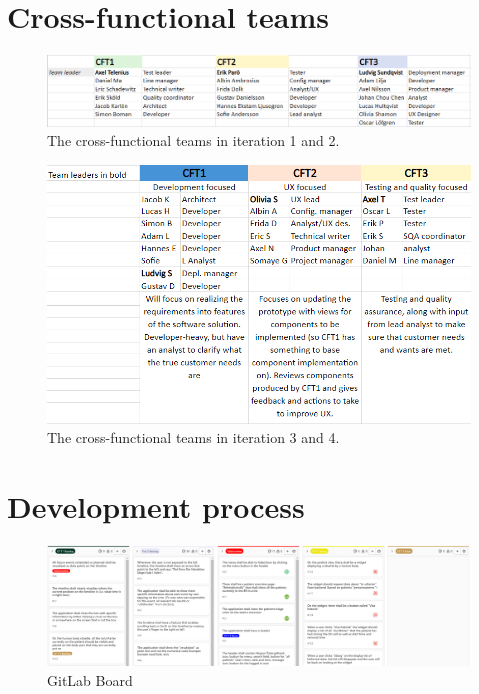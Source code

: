 \appendix

\section{Cross-functional teams}
\label{sec:CFTs-appendix}
 \begin{figure}[h!]
     \centering\includegraphics[width=1 \linewidth]{figures/CFTs it 1-2.PNG}
     \caption{The cross-functional teams in iteration 1 and 2. }
\end{figure}
 \begin{figure}[h!]
     \centering\includegraphics[width=1 \linewidth]{figures/CFTs it 3-4.PNG}
     \caption{The cross-functional teams in iteration 3 and 4.}
\end{figure}


\section{Development process}
\label{sec:dev-process-appendix}
 \begin{figure}[h!]
     \centering\includegraphics[width=1 \linewidth]{figures/Gitlab board.PNG}
     \caption{GitLab Board}
\end{figure}
